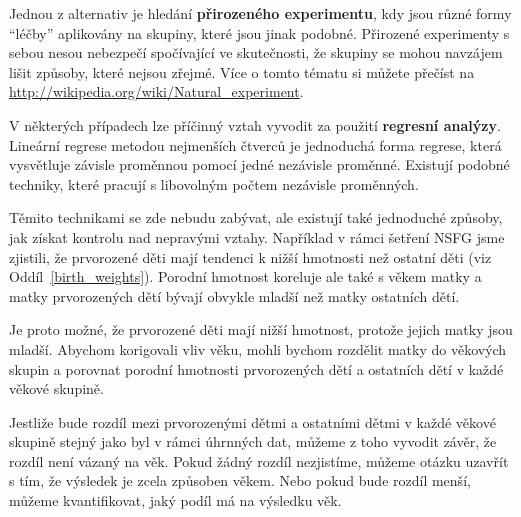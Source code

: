 \documentclass[12pt]{book}
\begin{document}
Jednou z alternativ je hledání {\bf přirozeného experimentu}, kdy jsou různé formy
``léčby'' aplikovány na skupiny, které jsou jinak podobné. Přirozené experimenty s sebou nesou nebezpečí spočívající ve skutečnosti, že skupiny se mohou navzájem lišit způsoby, které nejsou zřejmé. Více o tomto tématu si můžete přečíst
na \url{http://wikipedia.org/wiki/Natural_experiment}.

V některých případech lze příčinný vztah vyvodit za použití {\bf
  regresní analýzy}.  Lineární regrese metodou nejmenších čtverců je jednoduchá forma regrese, která vysvětluje závisle proměnnou pomocí jedné nezávisle proměnné. Existují podobné techniky, které pracují s libovolným počtem nezávisle proměnných.

Těmito technikami se zde nebudu zabývat, ale existují také jednoduché způsoby, jak získat kontrolu nad nepravými vztahy. Například v rámci šetření NSFG jsme zjistili, že prvorozené děti mají tendenci k nižší hmotnosti než ostatní děti (viz
Oddíl~\ref{birth_weights}).  Porodní hmotnost koreluje ale také s věkem matky a matky prvorozených dětí bývají obvykle mladší než matky ostatních dětí.

Je proto možné, že prvorozené děti mají nižší hmotnost, protože jejich matky jsou mladší. Abychom korigovali vliv věku, mohli bychom rozdělit matky do věkových skupin a porovnat porodní hmotnosti prvorozených dětí a ostatních dětí v každé věkové skupině.

Jestliže bude rozdíl mezi prvorozenými dětmi a ostatními dětmi v každé věkové skupině stejný jako byl v rámci úhrnných dat, můžeme z toho vyvodit závěr, že rozdíl není vázaný na věk. Pokud žádný rozdíl nezjistíme, můžeme otázku uzavřít s tím, že výsledek je zcela způsoben věkem. Nebo pokud bude rozdíl menší, můžeme kvantifikovat, jaký podíl má na výsledku věk.
\end{document}
